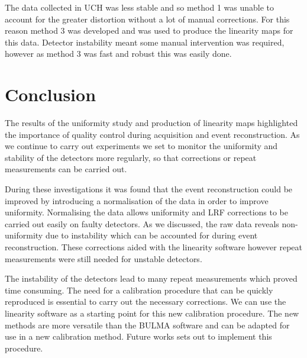 The data collected in \acrshort{UCH} was less stable and so method 1 was unable to account for the greater distortion without a lot of manual corrections. For this reason method 3 was developed and was used to produce the linearity maps for this data. Detector instability meant some manual intervention was required, however as method 3 was fast and robust this was easily done. 
\section{Conclusion}
The results of the uniformity study and production of linearity maps highlighted the importance of quality control during acquisition and event reconstruction. As we continue to carry out experiments we set to monitor the uniformity and stability of the detectors more regularly, so that corrections or repeat measurements can be carried out.

During these investigations it was found that the event reconstruction could be improved by introducing a normalisation of the data in order to improve uniformity. Normalising the data allows uniformity and \acrshort{LRF} corrections to be carried out easily on faulty detectors. As we discussed, the raw data reveals  non-uniformity due to instability which can be accounted for during event reconstruction. These corrections aided with the linearity software however repeat measurements were still needed for unstable detectors. 

The instability of the detectors lead to many repeat measurements which proved time consuming. The need for a calibration procedure that can be quickly reproduced is essential to carry out the necessary corrections. We can use the linearity software as a starting point for this new calibration procedure. The new methods are more versatile than the BULMA software and can be adapted for use in a new calibration method. Future works sets out to implement this procedure. 
